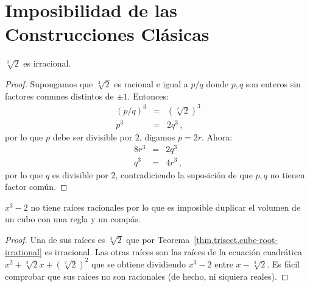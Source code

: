 
\section{Imposibilidad de las Construcciones Clásicas}\label{s.trisect-impossible}

\begin{theorem}\label{thm.trisect.cube-root-irrational}
$\sqrt[3]{2}$ es irracional.
\end{theorem}
\begin{proof}
Supongamos que $\sqrt[3]{2}$ es racional e igual a $p/q$ donde $p,q$ son enteros sin factores comunes distintos de $\pm 1$. Entonces:
\begin{eqnarray*}
(p/q)^3&=&(\sqrt[3]{2})^3\\
p^3&=&2q^3\,,
\end{eqnarray*}
por lo que $p$ debe ser divisible por $2$, digamos $p=2r$. Ahora:
\begin{eqnarray*}
8r^3&=&2q^3\\
q^3&=&4r^3\,,
\end{eqnarray*}
por lo que $q$ es divisible por $2$, contradiciendo la suposición de que $p,q$ no tienen factor común.
\end{proof}

\begin{theorem}
$x^3-2$ no tiene raíces racionales por lo que es imposible duplicar el volumen de un cubo con una regla y un compás.
\end{theorem}
\begin{proof}
Una de sus raíces es $\sqrt[3]{2}$ que por Teorema~\ref{thm.trisect.cube-root-irrational} es irracional. Las otras raíces son las raíces de la ecuación cuadrática $x^2+\sqrt[3]{2}x+(\sqrt[3]{2})^2$ que se obtiene dividiendo $x^3-2$ entre $x-\sqrt[3]{2}$. Es fácil comprobar que sus raíces no son racionales (de hecho, ni siquiera reales).
\end{proof}

\newpage


